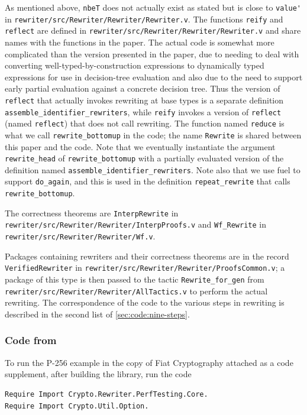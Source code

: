 \begin{subappendices}
As mentioned above, \verb|nbeT| does not actually exist as stated but is close to \verb|value'| in \texttt{rewriter/src/Rewriter/Rewriter/Rewriter.v}.
The functions \verb|reify| and \verb|reflect| are defined in \texttt{rewriter/src/Rewriter/Rewriter/Rewriter.v} and share names with the functions in the paper.
The actual code is somewhat more complicated than the version presented in the paper, due to needing to deal with converting well-typed-by-construction expressions to dynamically typed expressions for use in decision-tree evaluation and also due to the need to support early partial evaluation against a concrete decision tree.
Thus the version of \verb|reflect| that actually invokes rewriting at base types is a separate definition \verb|assemble_identifier_rewriters|, while \verb|reify| invokes a version of \verb|reflect| (named \verb|reflect|) that does not call rewriting.
The function named \texttt{reduce} is what we call \verb|rewrite_bottomup| in the code; the name \verb|Rewrite| is shared between this paper and the code.
Note that we eventually instantiate the argument \verb|rewrite_head| of \verb|rewrite_bottomup| with a partially evaluated version of the definition named \verb|assemble_identifier_rewriters|.
Note also that we use fuel to support \verb|do_again|, and this is used in the definition \verb|repeat_rewrite| that calls \verb|rewrite_bottomup|.

The correctness theorems are \verb|InterpRewrite| in \texttt{rewriter/src/Rewriter/Rewriter/InterpProofs.v} and \verb|Wf_Rewrite| in \texttt{rewriter/src/Rewriter/Rewriter/Wf.v}.

Packages containing rewriters and their correctness theorems are in the record \verb|VerifiedRewriter| in \texttt{rewriter/src/Rewriter/Rewriter/ProofsCommon.v};
a package of this type is then passed to the tactic \verb|Rewrite_for_gen| from \texttt{rewriter/src/Rewriter/Rewriter/AllTactics.v} to perform the actual rewriting.
The correspondence of the code to the various steps in rewriting is described in the second list of \autoref{sec:code:nine-steps}.

\subsubsection{Code from }

To run the P-256 example in the copy of Fiat Cryptography attached as a code supplement, after building the library, run the code
\begin{verbatim}
Require Import Crypto.Rewriter.PerfTesting.Core.
Require Import Crypto.Util.Option.


\end{verbatim}
\end{subappendices}
